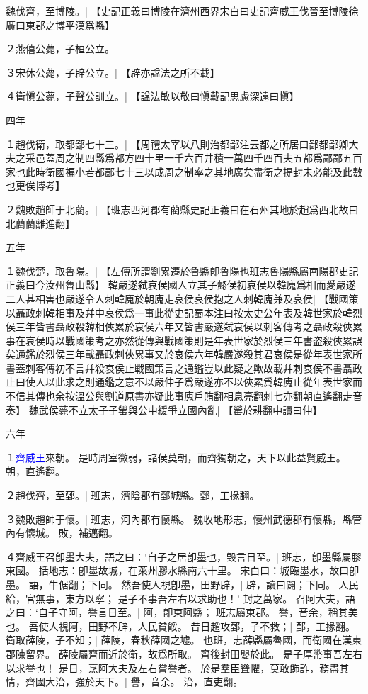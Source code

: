魏伐齊，至博陵。|{
	【史記正義曰博陵在濟州西界宋白曰史記齊威王伐晉至博陵徐廣曰東郡之博平漢爲縣】}

２燕僖公薨，子桓公立。

３宋休公薨，子辟公立。|{
	【辟亦諡法之所不載】}

４衛愼公薨，子聲公訓立。|{
	【諡法敏以敬曰愼戴記思慮深遠曰愼】
	}


	四年

１趙伐衛，取都鄙七十三。|{
	【周禮太宰以八則治都鄙注云都之所居曰鄙都鄙卿大夫之采邑蓋周之制四縣爲都方四十里一千六百井積一萬四千四百夫五都爲鄙鄙五百家也此時衛國褊小若都鄙七十三以成周之制率之其地廣矣盡衛之提封未必能及此數也更俟博考】}

２魏敗趙師于北藺。|{
	【班志西河郡有藺縣史記正義曰在石州其地於趙爲西北故曰北藺藺離進翻】}


	五年

１魏伐楚，取魯陽。|{
	【左傳所謂劉累遷於魯縣卽魯陽也班志魯陽縣屬南陽郡史記正義曰今汝州魯山縣】}
韓嚴遂弑哀侯國人立其子懿侯初哀侯以韓廆爲相而愛嚴遂二人甚相害也嚴遂令人刺韓廆於朝廆走哀侯哀侯抱之人刺韓廆兼及哀侯|{
	【戰國策以聶政刺韓相事及幷中哀侯爲一事此從史記蜀本注曰按太史公年表及韓世家於韓烈侯三年皆書聶政殺韓相俠累於哀侯六年又皆書嚴遂弑哀侯以刺客傳考之聶政殺俠累事在哀侯時以戰國策考之亦然從傳與戰國策則是年表世家於烈侯三年書盗殺俠累誤矣通鑑於烈侯三年載聶政刺俠累事又於哀侯六年韓嚴遂殺其君哀侯是從年表世家所書蓋刺客傳初不言幷殺哀侯止戰國策言之通鑑豈以此疑之歟故載幷刺哀侯不書聶政止曰使人以此求之則通鑑之意不以嚴仲子爲嚴遂亦不以俠累爲韓廆止從年表世家而不信其傳也余按溫公與劉道原書亦疑此事廆戶賄翻相息亮翻刺七亦翻朝直遙翻走音奏】}
魏武侯薨不立太子子罃與公中緩爭立國內亂|{
	【罃於耕翻中讀曰仲】}


六年

１\textcolor{blue}{齊威王}來朝。
是時周室微弱，諸侯莫朝，而齊獨朝之，天下以此益賢威王。|{
	朝，直遙翻。
	}

２趙伐齊，至鄄。|{
	班志，濟陰郡有鄄城縣。鄄，工掾翻。
	}

３魏敗趙師于懷。|{
	班志，河內郡有懷縣。
	魏收地形志，懷州武德郡有懷縣，縣管內有懷城。
	敗，補邁翻。
	}

４齊威王召卽墨大夫，語之曰：‘自子之居卽墨也，毁言日至。|{
	班志，卽墨縣屬膠東國。
	括地志：卽墨故城，在萊州膠水縣南六十里。
	宋白曰：城臨墨水，故曰卽墨。
	語，牛倨翻；下同。
	}
然吾使人視卽墨，田野辟，|{
	辟，讀曰闢；下同。
	}
人民給，官無事，東方以寧；
是子不事吾左右以求助也！’
封之萬家。
召阿大夫，語之曰：‘自子守阿，譽言日至。|{
	阿，卽東阿縣；
	班志屬東郡。
	譽，音余，稱其美也。
	}
吾使人視阿，田野不辟，人民貧餒。
昔日趙攻鄄，子不救；|{
	鄄，工掾翻。
	}
衛取薛陵，子不知；|{
	薛陵，春秋薛國之墟。
	也班，志薛縣屬魯國，而衛國在漢東郡陳留界。
	薛陵屬齊而近於衛，故爲所取。
	齊後封田嬰於此。
	}
是子厚幣事吾左右以求譽也！
是日，烹阿大夫及左右嘗譽者。
於是羣臣聳懼，莫敢飾詐，務盡其情，齊國大治，強於天下。|{
	譽，音余。
	治，直吏翻。
	}

